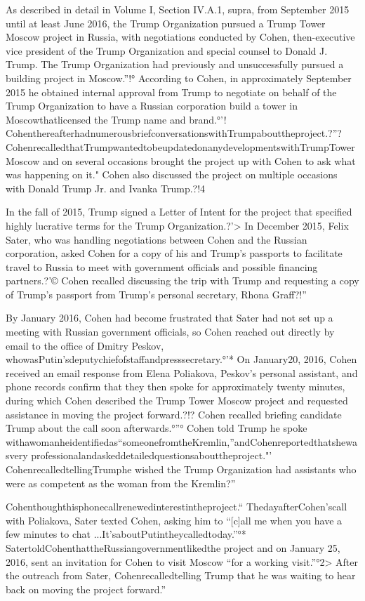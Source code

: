 As described in detail in Volume I, Section IV.A.1, supra, from September 2015 until at least June 2016, the Trump Organization pursued a Trump Tower Moscow project in Russia, with negotiations conducted by Cohen, then-executive vice president of the Trump Organization and special counsel to Donald J. Trump.%
The Trump Organization had previously and unsuccessfully pursued a building project in Moscow.”!° According to Cohen, in approximately September 2015 he obtained internal approval from Trump to negotiate on behalf of the Trump Organization to have a Russian corporation build a tower in Moscowthatlicensed the Trump name and brand.°'! CohenthereafterhadnumerousbriefconversationswithTrumpabouttheproject.?”? CohenrecalledthatTrumpwantedtobeupdatedonanydevelopmentswithTrumpTowerMoscow and on several occasions brought the project up with Cohen to ask what was happening on it." Cohen also discussed the project on multiple occasions with Donald Trump Jr. and Ivanka Trump.?!4

In the fall of 2015, Trump signed a Letter of Intent for the project that specified highly lucrative terms for the Trump Organization.?'> In December 2015, Felix Sater, who was handling negotiations between Cohen and the Russian corporation, asked Cohen for a copy of his and Trump's passports to facilitate travel to Russia to meet with government officials and possible financing partners.?'© Cohen recalled discussing the trip with Trump and requesting a copy of Trump's passport from Trump's personal secretary, Rhona Graff?!”

By January 2016, Cohen had become frustrated that Sater had not set up a meeting with Russian government officials, so Cohen reached out directly by email to the office of Dmitry Peskov, whowasPutin'sdeputychiefofstaffandpresssecretary.°'* On January20, 2016, Cohen received an email response from Elena Poliakova, Peskov's personal assistant, and phone records confirm that they then spoke for approximately twenty minutes, during which Cohen described the Trump Tower Moscow project and requested assistance in moving the project forward.?!? Cohen recalled briefing candidate Trump about the call soon afterwards.°”° Cohen told Trump he spoke withawomanheidentifiedas“someonefromtheKremlin,”andCohenreportedthatshewasvery professionalandaskeddetailedquestionsabouttheproject."' CohenrecalledtellingTrumphe wished the Trump Organization had assistants who were as competent as the woman from the Kremlin?”

Cohenthoughthisphonecallrenewedinterestintheproject.“ ThedayafterCohen'scall with Poliakova, Sater texted Cohen, asking him to “[c]all me when you have a few minutes to chat ...It'saboutPutintheycalledtoday.”°* SatertoldCohenthattheRussiangovernmentlikedthe project and on January 25, 2016, sent an invitation for Cohen to visit Moscow “for a working visit.”°2> After the outreach from Sater, Cohenrecalledtelling Trump that he was waiting to hear back on moving the project forward.”

